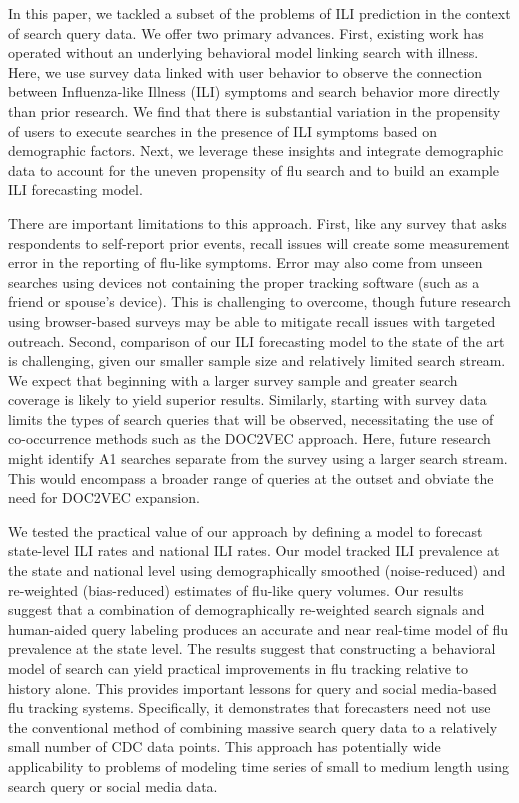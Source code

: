 \documentclass[fleqn,10pt]{wlscirep}
\begin{document}
In this paper, we tackled a subset of the problems of ILI prediction in the context of search query data. We offer two primary advances. First, existing work has operated without an underlying behavioral model linking search with illness. Here, we use survey data linked with user behavior to observe the connection between Influenza-like Illness (ILI) symptoms and search behavior more directly than prior research. We find that there is substantial variation in the propensity of users to execute searches in the presence of ILI symptoms based on demographic factors. Next, we leverage these insights and integrate demographic data to account for the uneven propensity of flu search and to build an example ILI forecasting model.

There are important limitations to this approach. First, like any survey that asks respondents to self-report prior events, recall issues will create some measurement error in the reporting of flu-like symptoms. Error may also come from unseen searches using devices not containing the proper tracking software (such as a friend or spouse's device). This is challenging to overcome, though future research using browser-based surveys may be able to mitigate recall issues with targeted outreach. Second, comparison of our ILI forecasting model to the state of the art is challenging, given our smaller sample size and relatively limited search stream. We expect that beginning with a larger survey sample and greater search coverage is likely to yield superior results. Similarly, starting with survey data limits the types of search queries that will be observed, necessitating the use of co-occurrence methods such as the DOC2VEC approach. Here, future research might identify A1 searches separate from the survey using a larger search stream. This would encompass a broader range of queries at the outset and obviate the need for DOC2VEC expansion. 

We tested the practical value of our approach by defining a model to forecast state-level ILI rates and national ILI rates. Our model tracked ILI prevalence at the state and national level using demographically smoothed (noise-reduced) and re-weighted (bias-reduced) estimates of flu-like query volumes. Our results suggest that a combination of demographically re-weighted search signals and human-aided query labeling produces an accurate and near real-time model of flu prevalence at the state level. The results suggest that constructing a behavioral model of search can yield practical improvements in flu tracking relative to history alone. This provides important lessons for query and social media-based flu tracking systems. Specifically, it demonstrates that forecasters need not use the conventional method of combining massive search query data to a relatively small number of CDC data points. This approach has potentially wide applicability to problems of modeling time series of small to medium length using search query or social media data. 
\end{document}
